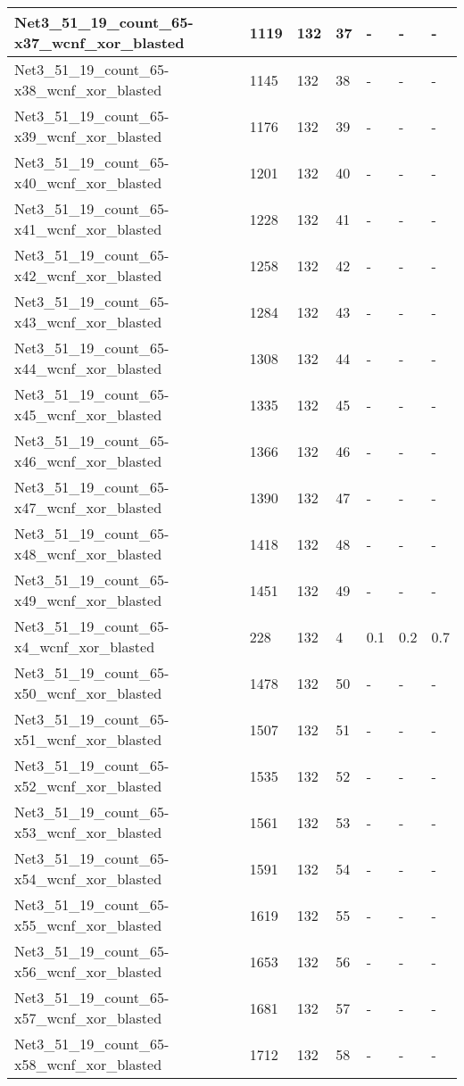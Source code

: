 \begin{scriptsize}
\begin{longtable}{|p{5cm}|l|l|l|l|l|l|}
Net3\_51\_19\_count\_65-x37\_wcnf\_xor\_blasted&1119&132&37&-&-&- \\ \hline 
Net3\_51\_19\_count\_65-x38\_wcnf\_xor\_blasted&1145&132&38&-&-&- \\ \hline 
Net3\_51\_19\_count\_65-x39\_wcnf\_xor\_blasted&1176&132&39&-&-&- \\ \hline 
Net3\_51\_19\_count\_65-x40\_wcnf\_xor\_blasted&1201&132&40&-&-&- \\ \hline 
Net3\_51\_19\_count\_65-x41\_wcnf\_xor\_blasted&1228&132&41&-&-&- \\ \hline 
Net3\_51\_19\_count\_65-x42\_wcnf\_xor\_blasted&1258&132&42&-&-&- \\ \hline 
Net3\_51\_19\_count\_65-x43\_wcnf\_xor\_blasted&1284&132&43&-&-&- \\ \hline 
Net3\_51\_19\_count\_65-x44\_wcnf\_xor\_blasted&1308&132&44&-&-&- \\ \hline 
Net3\_51\_19\_count\_65-x45\_wcnf\_xor\_blasted&1335&132&45&-&-&- \\ \hline 
Net3\_51\_19\_count\_65-x46\_wcnf\_xor\_blasted&1366&132&46&-&-&- \\ \hline 
Net3\_51\_19\_count\_65-x47\_wcnf\_xor\_blasted&1390&132&47&-&-&- \\ \hline 
Net3\_51\_19\_count\_65-x48\_wcnf\_xor\_blasted&1418&132&48&-&-&- \\ \hline 
Net3\_51\_19\_count\_65-x49\_wcnf\_xor\_blasted&1451&132&49&-&-&- \\ \hline 
Net3\_51\_19\_count\_65-x4\_wcnf\_xor\_blasted&228&132&4&0.1&0.2&0.7 \\ \hline 
Net3\_51\_19\_count\_65-x50\_wcnf\_xor\_blasted&1478&132&50&-&-&- \\ \hline 
Net3\_51\_19\_count\_65-x51\_wcnf\_xor\_blasted&1507&132&51&-&-&- \\ \hline 
Net3\_51\_19\_count\_65-x52\_wcnf\_xor\_blasted&1535&132&52&-&-&- \\ \hline 
Net3\_51\_19\_count\_65-x53\_wcnf\_xor\_blasted&1561&132&53&-&-&- \\ \hline 
Net3\_51\_19\_count\_65-x54\_wcnf\_xor\_blasted&1591&132&54&-&-&- \\ \hline 
Net3\_51\_19\_count\_65-x55\_wcnf\_xor\_blasted&1619&132&55&-&-&- \\ \hline 
Net3\_51\_19\_count\_65-x56\_wcnf\_xor\_blasted&1653&132&56&-&-&- \\ \hline 
Net3\_51\_19\_count\_65-x57\_wcnf\_xor\_blasted&1681&132&57&-&-&- \\ \hline 
Net3\_51\_19\_count\_65-x58\_wcnf\_xor\_blasted&1712&132&58&-&-&- \\ \hline 

\end{longtable}
\end{scriptsize}
